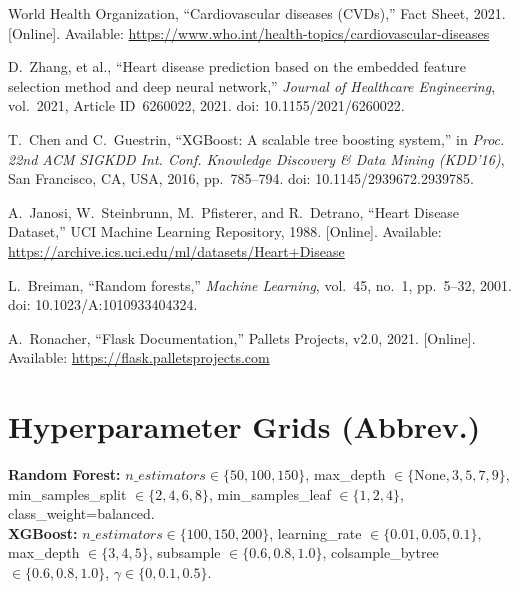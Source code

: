 \documentclass[conference]{IEEEtran}
\begin{document}
\begin{thebibliography}{00}

World Health Organization, ``Cardiovascular diseases (CVDs),'' Fact Sheet, 2021. [Online]. Available: \url{https://www.who.int/health-topics/cardiovascular-diseases}

D.~Zhang, et al., ``Heart disease prediction based on the embedded feature selection method and deep neural network,'' \emph{Journal of Healthcare Engineering}, vol.~2021, Article ID~6260022, 2021. doi: 10.1155/2021/6260022.

T.~Chen and C.~Guestrin, ``XGBoost: A scalable tree boosting system,'' in \emph{Proc. 22nd ACM SIGKDD Int. Conf. Knowledge Discovery \& Data Mining (KDD'16)}, San Francisco, CA, USA, 2016, pp.~785--794. doi: 10.1145/2939672.2939785.

A.~Janosi, W.~Steinbrunn, M.~Pfisterer, and R.~Detrano, ``Heart Disease Dataset,'' UCI Machine Learning Repository, 1988. [Online]. Available: \url{https://archive.ics.uci.edu/ml/datasets/Heart+Disease}

L.~Breiman, ``Random forests,'' \emph{Machine Learning}, vol.~45, no.~1, pp.~5--32, 2001. doi: 10.1023/A:1010933404324.

A.~Ronacher, ``Flask Documentation,'' Pallets Projects, v2.0, 2021. [Online]. Available: \url{https://flask.palletsprojects.com}

\end{thebibliography}
\pagebreak

\appendices
\section{Hyperparameter Grids (Abbrev.)}
\textbf{Random Forest:} \(n\_estimators \in \{50,100,150\}\), max\_depth \(\in \{\text{None},3,5,7,9\}\), min\_samples\_split \(\in \{2,4,6,8\}\), min\_samples\_leaf \(\in \{1,2,4\}\), class\_weight=balanced.\\
\textbf{XGBoost:} \(n\_estimators \in \{100,150,200\}\), learning\_rate \(\in \{0.01,0.05,0.1\}\), max\_depth \(\in \{3,4,5\}\), subsample \(\in \{0.6,0.8,1.0\}\), colsample\_bytree \(\in \{0.6,0.8,1.0\}\), \(\gamma \in \{0,0.1,0.5\}\).

\IEEEoverridecommandlockouts
{}
\end{document}

